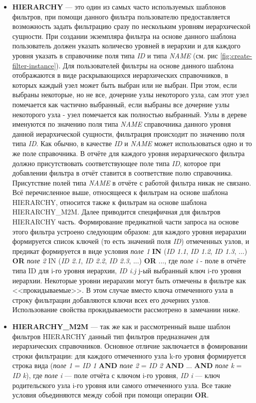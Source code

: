 \documentclass[../user-manual.tex]{subfiles}
\begin{document}
\begin{itemize}
		\item \textbf{HIERARCHY} --- это один из самых часто используемых шаблонов фильтров, при помощи данного фильтра пользователю предоставляется возможность задать фильтрацию сразу по нескольким уровням иерархической сущности. При создании экземпляра фильтра на основе данного шаблона пользователь должен указать количесво уровней в иерархии и для каждого уровня указать в справочнике поля типа \textit{ID} и типа \textit{NAME} (см. рис \ref{fig:create-filter-instance}). Для пользователей фильтры на основе данного шаблона отображаются в виде раскрывающихся иерархических справочников, в которых каждый узел может быть выбран или не выбран. При этом, если выбраны некоторые, но не все, дочерние узлы некоторого узла, сам этот узел помечается как частично выбранный, если выбраны все дочерние узлы некоторого узла - узел помечается как полностью выбранный. Узлы в дереве именуются по значению поля типа \textit{NAME} справочника данного уровня данной иерархической сущности, фильтрация происходит по значению поля типа \textit{ID}. Как обычно, в качестве \textit{ID} и \textit{NAME} может использоваться одно и то же поле справочника. В отчёте для каждого уровня иерархического фильтра должно присутствовать соответствующее поле типа \textit{ID}, которое при добавлении фильтра в отчёт ставится в соответствие полю справочника. Присутствие полей типа \textit{NAME} в отчёте с работой фильтра никак не связано. Всё перечисленное выше, относящееся к фильтрам на основе шаблона HIERARCHY, относится также к фильтрам на основе шаблона HIERARCHY\_M2M. Далее приводится специфичная для фильтров HIERARCHY часть. Формирование предикатной части запроса на основе этого фильтра устроено следующим образом: для каждого уровня иерарахии формируется список ключей (то есть значений поля \textit{ID}) отмеченных узлов, и предикат формируется в виде условия \textit{поле 1} \textbf{IN} (\textit{ID 1.1}, \textit{ID 1.2}, \textit{ID 1.3}, ...) \textbf{OR} \textit{поле 2} IN (\textit{ID 2.1}, \textit{ID 2.2}, \textit{ID 2.3}, ...) \textbf{OR} ..., где \textit{поле i} - поле в отчёте типа ID для i-го уровня иерархии, \textit{ID i.j} j-ый выбранный ключ i-го уровня иерархии. Некоторые уровни иерарахии могут быть отмечены в фильтре как <<прокидываемые>>. В этом случае вместо ключа отмеченного узла в строку фильтрации добавляются ключи всех его дочерних узлов. Использование свойства прокидываемости рассмотрено в замечании ниже.
		
		\item \textbf{HIERARCHY\_M2M} --- так же как и рассмотренный выше шаблон фильтров HIERARCHY данный тип фильтров предназначен для иерархических справочников. Основное отличие заключается в фомировании строки фильтрации: для каждого отмеченного узла k-го уровня формируется строка вида (\textit{поле 1} = \textit{ID 1} \textbf{AND} \textit{поле 2} = \textit{ID 2} \textbf{AND} ... \textbf{AND} \textit{поле k} = \textit{ID k}), где \textit{поле i} --- поле отчёта с ключом i-го уровня, \textit{ID i} --- ключ родительского узла i-го уровня или самого отмеченного узла. Все такие условия объединяются между собой при помощи операции \textbf{OR}.


\end{itemize}
\end{document}
